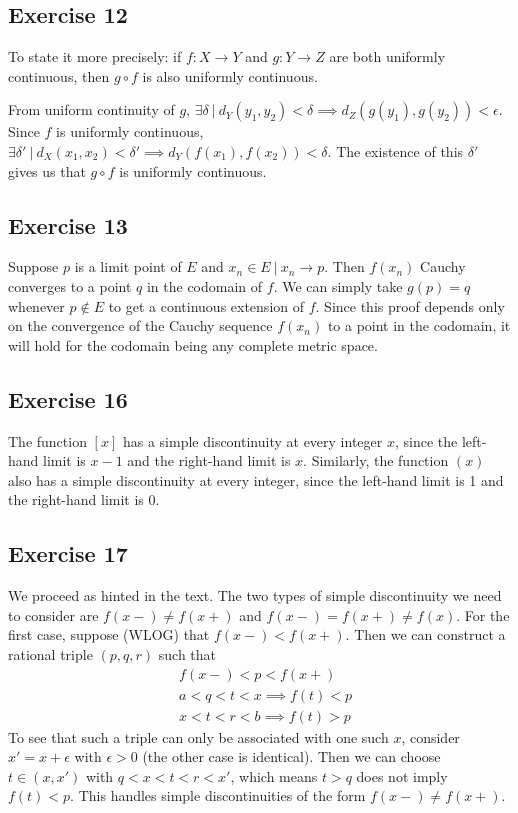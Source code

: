 \subsection{Exercise 12}
To state it more precisely: if $f: X \to Y$ and $g: Y \to Z$ are both uniformly continuous, then $g \circ f$ 
is also uniformly continuous.

From uniform continuity of $g$, $\exists \delta \: | \: d_Y(y_1, y_2) < \delta \implies d_Z(g(y_1), g(y_2)) < \epsilon$.
Since $f$ is uniformly continuous, $\exists \delta' \: | \: d_X(x_1, x_2) < \delta' \implies
d_Y(f(x_1), f(x_2)) < \delta$. The existence of this $\delta'$ gives us that $g \circ f$ is uniformly
continuous.

\subsection{Exercise 13}
Suppose $p$ is a limit point of $E$ and $x_n \in E \: | \: x_n \to p$.
Then $f(x_n)$ Cauchy converges to a point $q$ in the codomain of $f$. We can simply take $g(p) = q$
whenever $p \notin E$ to get a continuous extension of $f$. Since this proof depends only on the convergence
of the Cauchy sequence $f(x_n)$ to a point in the codomain, it will hold for the codomain being any
complete metric space.

\subsection{Exercise 16}
The function $[x]$ has a simple discontinuity at every integer $x$, since the left-hand limit is  $x-1$ 
and the right-hand limit is $x$. Similarly, the function $(x)$ also has a simple discontinuity at every integer,
 since the left-hand limit is 1 and the right-hand limit is 0.

\subsection{Exercise 17}
We proceed as hinted in the text. The two types of simple discontinuity we need to consider are
$f(x-) \neq f(x+)$ and $f(x-) = f(x+) \neq f(x)$. For the first case, suppose (WLOG) that
$f(x-) < f(x+)$. Then we can construct a rational triple $(p, q, r)$ such that 
\begin{align*}
        &f(x-) < p < f(x+) \\
        &a < q < t < x \implies f(t) < p \\
        &x < t < r < b \implies f(t) > p
\end{align*}
To see that such a triple can only be associated with one such $x$, consider $x' = x + \epsilon$ with
$\epsilon > 0$ (the other case is identical). Then we can choose $t \in (x, x')$ with $q < x < t < r < x'$,
which means $t > q$ does not imply $f(t) < p$. This handles simple discontinuities of the form
$f(x-) \neq f(x+)$.


